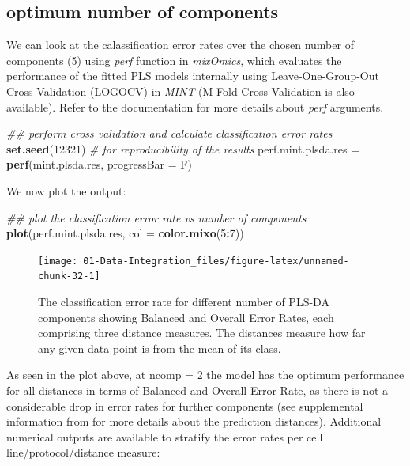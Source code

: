 \documentclass[]{book}
\newenvironment{Shaded}{\begin{snugshade}}{\end{snugshade}}
\newcommand{\CommentTok}[1]{\textcolor[rgb]{0.56,0.35,0.01}{\textit{#1}}}
\newcommand{\DataTypeTok}[1]{\textcolor[rgb]{0.13,0.29,0.53}{#1}}
\newcommand{\DecValTok}[1]{\textcolor[rgb]{0.00,0.00,0.81}{#1}}
\newcommand{\KeywordTok}[1]{\textcolor[rgb]{0.13,0.29,0.53}{\textbf{#1}}}
\newcommand{\NormalTok}[1]{#1}
\newcommand{\OperatorTok}[1]{\textcolor[rgb]{0.81,0.36,0.00}{\textbf{#1}}}
\newcommand{\StringTok}[1]{\textcolor[rgb]{0.31,0.60,0.02}{#1}}
\theoremstyle{definition}
\theoremstyle{definition}
\theoremstyle{definition}
\theoremstyle{remark}
\begin{document}
\hypertarget{optimum-number-of-components}{%
\subsection{optimum number of
components}\label{optimum-number-of-components}}

We can look at the calassification error rates over the chosen number of
components (5) using \emph{perf} function in \emph{mixOmics}, which
evaluates the performance of the fitted PLS models internally using
Leave-One-Group-Out Cross Validation (LOGOCV) in \emph{MINT} (M-Fold
Cross-Validation is also available). Refer to the documentation for more
details about \emph{perf} arguments.

\begin{Shaded}
\begin{Highlighting}[]
\CommentTok{## perform cross validation and calculate classification error rates}
\KeywordTok{set.seed}\NormalTok{(}\DecValTok{12321}\NormalTok{)  }\CommentTok{# for reproducibility of the results}
\NormalTok{perf.mint.plsda.res =}\StringTok{ }\KeywordTok{perf}\NormalTok{(mint.plsda.res,}
          \DataTypeTok{progressBar =}\NormalTok{ F)}
\end{Highlighting}
\end{Shaded}

We now plot the output:

\begin{Shaded}
\begin{Highlighting}[]
\CommentTok{## plot the classification error rate vs number of components}
\KeywordTok{plot}\NormalTok{(perf.mint.plsda.res, }\DataTypeTok{col =} \KeywordTok{color.mixo}\NormalTok{(}\DecValTok{5}\OperatorTok{:}\DecValTok{7}\NormalTok{))}
\end{Highlighting}
\end{Shaded}

\begin{figure}[ht]

{\centering \texttt{[image: 01-Data-Integration\_files/figure-latex/unnamed-chunk-32-1]} 

}

\caption{The classification error rate for different number of PLS-DA components showing Balanced and Overall Error Rates, each comprising three distance measures. The distances measure how far any given data point is from the mean of its class.}\label{fig:unnamed-chunk-32}
\end{figure}

As seen in the plot above, at ncomp = 2 the model has the optimum
performance for all distances in terms of Balanced and Overall Error
Rate, as there is not a considerable drop in error rates for further
components (see supplemental information from \citep{R-mixOmics} for
more details about the prediction distances). Additional numerical
outputs are available to stratify the error rates per cell
line/protocol/distance measure:
\end{document}
